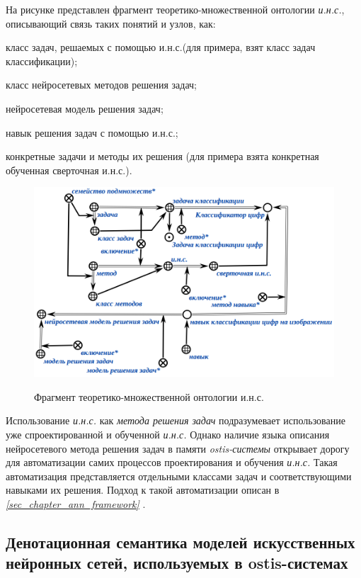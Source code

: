 На рисунке \textit{} представлен фрагмент теоретико-множественной онтологии \textit{и.н.с.}, описывающий связь таких понятий и узлов, как:
\begin{textitemize}
	\item класс задач, решаемых с помощью и.н.с.(для примера, взят класс задач классификации);
	\item класс нейросетевых методов решения задач;
	\item нейросетевая модель решения задач;
	\item навык решения задач с помощью и.н.с.;
	\item конкретные задачи и методы их решения (для примера взята конкретная обученная сверточная и.н.с.).
\end{textitemize}

\begin{figure}[H]
	\centering
	\caption{Фрагмент теоретико-множественной онтологии и.н.с.}
	\includegraphics[scale=0.5]{author/part3/figures/actions_concepts.png}
	\label{fig:actions_concepts}
\end{figure}

Использование \textit{и.н.с.} как\textit{ метода решения задач} подразумевает использование уже спроектированной и обученной \textit{и.н.с.} Однако наличие языка описания нейросетевого метода решения задач в памяти \textit{ostis-системы} открывает дорогу для автоматизации самих процессов проектирования и обучения \textit{и.н.с.} Такая автоматизация представляется отдельными классами задач и соответствующими навыками их решения. Подход к такой автоматизации описан в \textit{\ref{sec_chapter_ann_framework} }.

\subsection{Денотационная семантика моделей искусственных нейронных сетей, используемых в ostis-системах}

